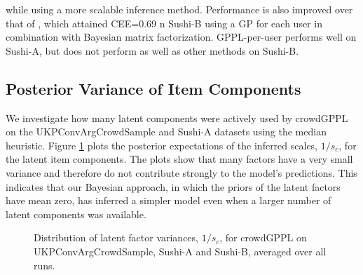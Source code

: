  while using a more scalable inference method.
Performance is also improved over that of \citep{khan2014scalable}, which 
attained CEE=0.69 n Sushi-B using
 a GP for each user in combination with Bayesian matrix factorization. 
GPPL-per-user performs well on Sushi-A, but does not perform as well as other methods on Sushi-B.

\subsection{Posterior Variance of Item Components}
\label{sec:components}

We investigate how many latent components were actively used by 
 crowdGPPL on the UKPConvArgCrowdSample and Sushi-A datasets 
 using the median heuristic.
Figure \ref{fig:latent_factor_variance}
plots the posterior expectations of the inferred scales, $1/s_c$, for the latent item 
 components. 
 The plots show
that many factors have a very small variance and therefore do not contribute strongly 
to the model's predictions. This indicates that our Bayesian approach, in which the priors
of the latent factors have mean zero, has inferred a simpler model even when
 a larger number of latent components was available.
\begin{figure}
\centering
{}
\caption{
Distribution of latent factor variances, $1/s_c$, for crowdGPPL on UKPConvArgCrowdSample, Sushi-A and Sushi-B, averaged over all runs.
}
\label{fig:latent_factor_variance}
\end{figure}